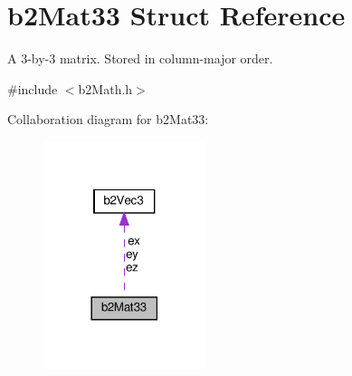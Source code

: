 \hypertarget{structb2Mat33}{}\section{b2\+Mat33 Struct Reference}
\label{structb2Mat33}


A 3-\/by-\/3 matrix. Stored in column-\/major order.  




{\ttfamily \#include $<$b2\+Math.\+h$>$}



Collaboration diagram for b2\+Mat33\+:
\nopagebreak
\begin{figure}[H]
\begin{center}
\leavevmode
\includegraphics[width=134pt]{structb2Mat33__coll__graph}
\end{center}
\end{figure}
